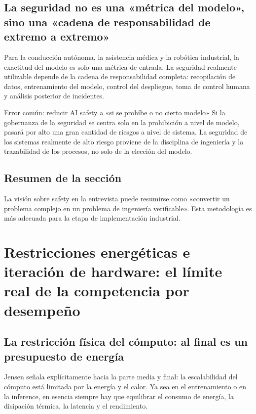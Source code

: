 \documentclass[a4paper]{article}
\begin{document}
\subsection{La seguridad no es una «métrica del modelo», sino una «cadena de responsabilidad de extremo a extremo»}

Para la conducción autónoma, la asistencia médica y la robótica industrial, la exactitud del modelo es solo una métrica de entrada. La seguridad realmente utilizable depende de la cadena de responsabilidad completa: recopilación de datos, entrenamiento del modelo, control del despliegue, toma de control humana y análisis posterior de incidentes.

\begin{warningbox}{Error común: reducir AI safety a «si se prohíbe o no cierto modelo»}
Si la gobernanza de la seguridad se centra solo en la prohibición a nivel de modelo, pasará por alto una gran cantidad de riesgos a nivel de sistema. La seguridad de los sistemas realmente de alto riesgo proviene de la disciplina de ingeniería y la trazabilidad de los procesos, no solo de la elección del modelo.
\end{warningbox}

\subsection{Resumen de la sección}
La visión sobre safety en la entrevista puede resumirse como «convertir un problema complejo en un problema de ingeniería verificable». Esta metodología es más adecuada para la etapa de implementación industrial.

\section{Restricciones energéticas e iteración de hardware: el límite real de la competencia por desempeño}

\subsection{La restricción física del cómputo: al final es un presupuesto de energía}

Jensen señala explícitamente hacia la parte media y final: la escalabilidad del cómputo está limitada por la energía y el calor. Ya sea en el entrenamiento o en la inference, en esencia siempre hay que equilibrar el consumo de energía, la disipación térmica, la latencia y el rendimiento.
\end{document}
